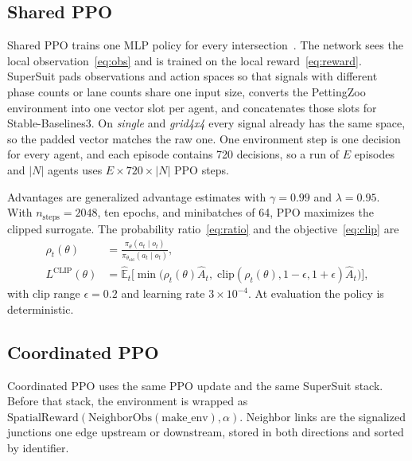 \documentclass[conference]{IEEEtran}
\begin{document}
\subsection{Shared PPO}
Shared PPO trains one MLP policy for every intersection~\cite{gupta2017cooperative,schulman2017ppo}. The network sees the local observation~\eqref{eq:obs} and is trained on the local reward~\eqref{eq:reward}. SuperSuit pads observations and action spaces so that signals with different phase counts or lane counts share one input size, converts the PettingZoo environment into one vector slot per agent, and concatenates those slots for Stable-Baselines3. On \emph{single} and \emph{grid4x4} every signal already has the same space, so the padded vector matches the raw one. One environment step is one decision for every agent, and each episode contains 720 decisions, so a run of $E$ episodes and $|N|$ agents uses $E \times 720 \times |N|$ PPO steps.

Advantages are generalized advantage estimates with $\gamma = 0.99$ and $\lambda = 0.95$. With $n_{\mathrm{steps}} = 2048$, ten epochs, and minibatches of 64, PPO maximizes the clipped surrogate. The probability ratio~\eqref{eq:ratio} and the objective~\eqref{eq:clip} are
\begin{align}
\rho_t(\theta) &= \frac{\pi_\theta(a_t \mid o_t)}{\pi_{\theta_{\mathrm{old}}}(a_t \mid o_t)}, \label{eq:ratio} \\
L^{\mathrm{CLIP}}(\theta) &= \hat{\mathbb{E}}_t \Big[ \min\big( \rho_t(\theta)\hat{A}_t,\; \mathrm{clip}(\rho_t(\theta), 1-\epsilon, 1+\epsilon)\hat{A}_t \big) \Big], \label{eq:clip}
\end{align}
with clip range $\epsilon = 0.2$ and learning rate $3 \times 10^{-4}$. At evaluation the policy is deterministic.

\subsection{Coordinated PPO}
Coordinated PPO uses the same PPO update and the same SuperSuit stack. Before that stack, the environment is wrapped as $\mathrm{SpatialReward}(\mathrm{NeighborObs}(\mathrm{make\_env}), \alpha)$. Neighbor links are the signalized junctions one edge upstream or downstream, stored in both directions and sorted by identifier.
\end{document}

